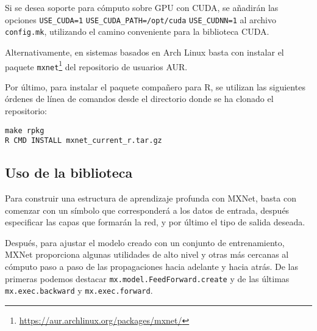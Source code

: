 Si se desea soporte para cómputo sobre GPU con CUDA, se añadirán las opciones \texttt{USE\_CUDA=1} \texttt{USE\_CUDA\_PATH=/opt/cuda} \texttt{USE\_CUDNN=1} al archivo \texttt{config.mk}, utilizando el camino conveniente para la biblioteca CUDA.

Alternativamente, en sistemas basados en Arch Linux basta con instalar el paquete \texttt{mxnet}\footnote{\url{https://aur.archlinux.org/packages/mxnet/}} del repositorio de usuarios AUR.

Por último, para instalar el paquete compañero para R, se utilizan las siguientes órdenes de línea de comandos desde el directorio donde se ha clonado el repositorio:

\begin{verbatim}
make rpkg
R CMD INSTALL mxnet_current_r.tar.gz
\end{verbatim}

\subsection{Uso de la biblioteca}
Para construir una estructura de aprendizaje profunda con MXNet, basta con comenzar con un símbolo que corresponderá a los datos de entrada, después especificar las capas que formarán la red, y por último el tipo de salida deseada.

Después, para ajustar el modelo creado con un conjunto de entrenamiento, MXNet proporciona algunas utilidades de alto nivel y otras más cercanas al cómputo paso a paso de las propagaciones hacia adelante y hacia atrás. De las primeras podemos destacar \texttt{mx.model.FeedForward.create} y de las últimas \texttt{mx.exec.backward} y \texttt{mx.exec.forward}.


